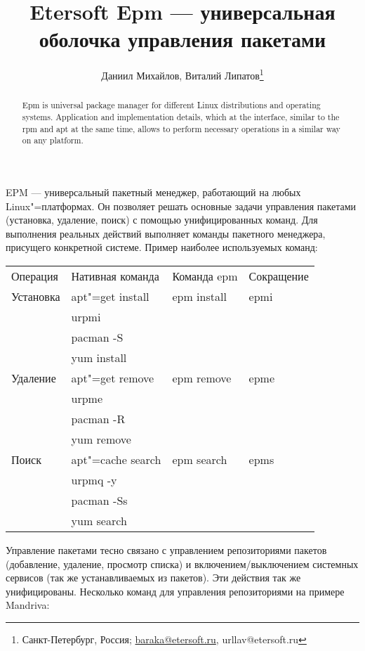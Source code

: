 \documentclass[10pt, a5paper]{article}
\begin{document}
\title{Etersoft Epm — универсальная оболочка управления пакетами}%

\author{Даниил Михайлов, Виталий Липатов\footnote{Санкт-Петербург, Россия; \url{baraka@etersoft.ru}, url{lav@etersoft.ru}}}
\maketitle

\begin{abstract}
Epm is universal package manager for different Linux distributions and operating systems. Application and implementation details, which at the interface, similar to the rpm and apt at the same time, allows to perform necessary operations in a similar way on any platform.
\end{abstract}

EPM — универсальный пакетный менеджер, работающий на любых Linux"=платформах. Он позволяет решать основные задачи управления пакетами (установка, удаление, поиск) с помощью унифицированных команд. Для выполнения реальных действий выполняет команды пакетного менеджера, присущего конкретной системе.
Пример наиболее используемых команд:

  \begin{tabular}{ l l l l }
    Операция   & Нативная команда  & Команда epm & Сокращение \\
    Установка  & apt"=get install  & epm install & epmi \\
    ~          & urpmi\\
    ~          & pacman -S\\
    ~          & yum install \\
    Удаление   & apt"=get remove   & epm remove  & epme \\
    ~          & urpme \\
    ~          & pacman -R \\
    ~          & yum remove \\
    Поиск      & apt"=cache search & epm search  & epms \\
    ~          & urpmq -y\\
    ~          & pacman -Ss \\
    ~          & yum search 
  \end{tabular}
Управление пакетами тесно связано с управлением репозиториями пакетов (добавление, удаление, просмотр списка) и включением/выключением системных сервисов (так же устанавливаемых из пакетов). Эти действия так же унифицированы. Несколько команд для управления репозиториями на примере Mandriva:
\end{document}
